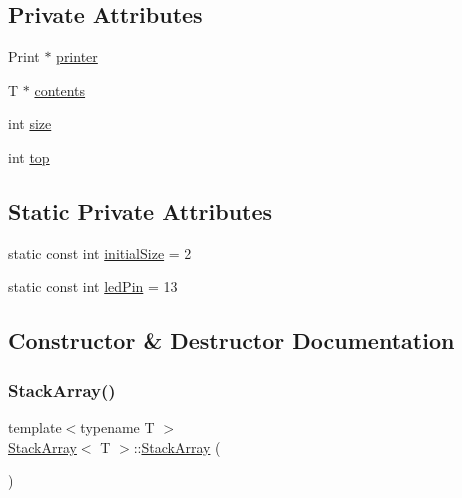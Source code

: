 \subsection*{Private Attributes}
\begin{DoxyCompactItemize}
\item 
Print $\ast$ \mbox{\hyperlink{class_stack_array_aea6faed36074555bee883bfc455e9e03}{printer}}
\item 
T $\ast$ \mbox{\hyperlink{class_stack_array_acdd1139a57e63bcd8107622f21b863ac}{contents}}
\item 
int \mbox{\hyperlink{class_stack_array_a4599de1e52a4242a4be684a7b92ca6e3}{size}}
\item 
int \mbox{\hyperlink{class_stack_array_a8f1080e6ccabdae9ee32c677828f442a}{top}}
\end{DoxyCompactItemize}
\subsection*{Static Private Attributes}
\begin{DoxyCompactItemize}
\item 
static const int \mbox{\hyperlink{class_stack_array_afaed95b05d5b775799d9c4395b253e27}{initial\+Size}} = 2
\item 
static const int \mbox{\hyperlink{class_stack_array_a4b476bb84919bd1abe05853b19d265b3}{led\+Pin}} = 13
\end{DoxyCompactItemize}


\subsection{Constructor \& Destructor Documentation}
\mbox{\label{class_stack_array_ac92cb0c4d8256fa3d116cd3d037d60c4}} 
\subsubsection{\texorpdfstring{Stack\+Array()}{StackArray()}}
{\footnotesize\ttfamily template$<$typename T $>$ \\
\mbox{\hyperlink{class_stack_array}{Stack\+Array}}$<$ T $>$\+::\mbox{\hyperlink{class_stack_array}{Stack\+Array}} (\begin{DoxyParamCaption}{ }\end{DoxyParamCaption})}

